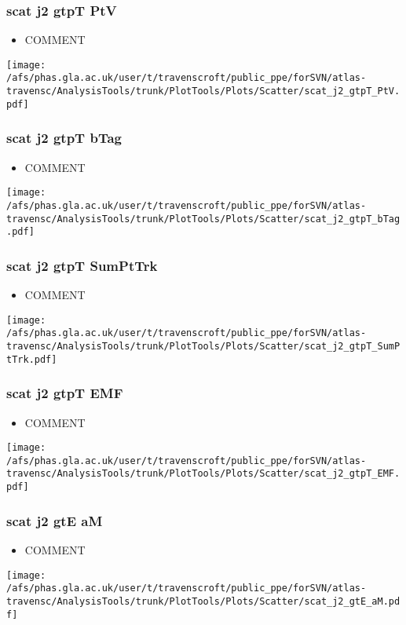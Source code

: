 \documentclass{beamer}
\begin{document}
\begin{frame}
\frametitle{scat j2 gtpT PtV}
\begin{itemize}
\item COMMENT
\end{itemize}
\begin{center}
\texttt{[image: /afs/phas.gla.ac.uk/user/t/travenscroft/public\_ppe/forSVN/atlas-travensc/AnalysisTools/trunk/PlotTools/Plots/Scatter/scat\_j2\_gtpT\_PtV.pdf]}
\end{center}
\end{frame}

\begin{frame}
\frametitle{scat j2 gtpT bTag}
\begin{itemize}
\item COMMENT
\end{itemize}
\begin{center}
\texttt{[image: /afs/phas.gla.ac.uk/user/t/travenscroft/public\_ppe/forSVN/atlas-travensc/AnalysisTools/trunk/PlotTools/Plots/Scatter/scat\_j2\_gtpT\_bTag.pdf]}
\end{center}
\end{frame}

\begin{frame}
\frametitle{scat j2 gtpT SumPtTrk}
\begin{itemize}
\item COMMENT
\end{itemize}
\begin{center}
\texttt{[image: /afs/phas.gla.ac.uk/user/t/travenscroft/public\_ppe/forSVN/atlas-travensc/AnalysisTools/trunk/PlotTools/Plots/Scatter/scat\_j2\_gtpT\_SumPtTrk.pdf]}
\end{center}
\end{frame}

\begin{frame}
\frametitle{scat j2 gtpT EMF}
\begin{itemize}
\item COMMENT
\end{itemize}
\begin{center}
\texttt{[image: /afs/phas.gla.ac.uk/user/t/travenscroft/public\_ppe/forSVN/atlas-travensc/AnalysisTools/trunk/PlotTools/Plots/Scatter/scat\_j2\_gtpT\_EMF.pdf]}
\end{center}
\end{frame}

\begin{frame}
\frametitle{scat j2 gtE aM}
\begin{itemize}
\item COMMENT
\end{itemize}
\begin{center}
\texttt{[image: /afs/phas.gla.ac.uk/user/t/travenscroft/public\_ppe/forSVN/atlas-travensc/AnalysisTools/trunk/PlotTools/Plots/Scatter/scat\_j2\_gtE\_aM.pdf]}
\end{center}
\end{frame}
\end{document}
